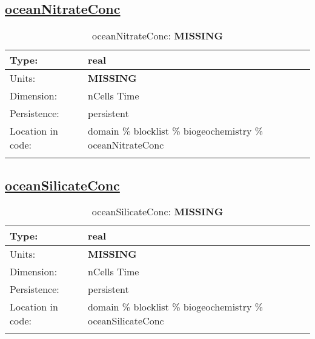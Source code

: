 \subsection[oceanNitrateConc]{\hyperref[sec:var_tab_biogeochemistry]{oceanNitrateConc}}
\label{subsec:var_sec_biogeochemistry_oceanNitrateConc}
\begin{center}
\begin{longtable}{| p{2.0in} | p{4.0in} |}
        \hline 
        Type: & real \\
        \hline 
        Units: & {\bf \color{red} MISSING} \\
        \hline 
        Dimension: & nCells Time \\
        \hline 
        Persistence: & persistent \\
        \hline 
         Location in code: & domain \% blocklist \% biogeochemistry \% oceanNitrateConc \\
         \hline 
    \caption{oceanNitrateConc: {\bf \color{red} MISSING}}
\end{longtable}
\end{center}
\subsection[oceanSilicateConc]{\hyperref[sec:var_tab_biogeochemistry]{oceanSilicateConc}}
\label{subsec:var_sec_biogeochemistry_oceanSilicateConc}
\begin{center}
\begin{longtable}{| p{2.0in} | p{4.0in} |}
        \hline 
        Type: & real \\
        \hline 
        Units: & {\bf \color{red} MISSING} \\
        \hline 
        Dimension: & nCells Time \\
        \hline 
        Persistence: & persistent \\
        \hline 
         Location in code: & domain \% blocklist \% biogeochemistry \% oceanSilicateConc \\
         \hline 
    \caption{oceanSilicateConc: {\bf \color{red} MISSING}}
\end{longtable}
\end{center}
